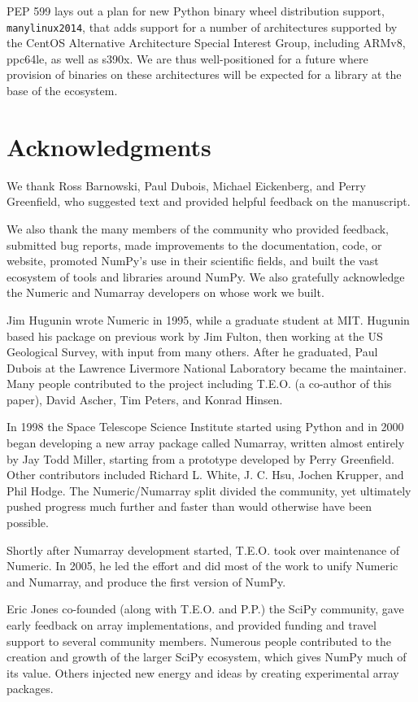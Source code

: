 \documentclass[twocolumn]{article}
\begin{document}
PEP 599 \cite{PEP599} lays out a plan for new Python binary wheel
distribution support, \texttt{manylinux2014}, that adds
support for a number of architectures supported by the CentOS
Alternative Architecture Special Interest Group, including
ARMv8, ppc64le, as well as s390x. We are thus well-positioned
for a future where provision of binaries on these architectures
will be expected for a library at the base of the ecosystem.
 
\section*{Acknowledgments}

We thank Ross Barnowski, Paul Dubois, Michael Eickenberg, and Perry Greenfield, who
suggested text and provided helpful feedback on the manuscript.

We also thank the many members of the community who provided
feedback, submitted bug reports, made improvements to the documentation,
code, or website, promoted NumPy's use in their scientific fields, and built
the vast ecosystem of tools and libraries around NumPy.
We also gratefully acknowledge the Numeric and Numarray developers
on whose work we built.  

Jim Hugunin wrote Numeric in 1995, while a graduate student at MIT.
Hugunin based his package on previous work by Jim Fulton, then working at the
US Geological Survey, with input from many others.
After he graduated, Paul Dubois at the Lawrence Livermore National Laboratory
became the maintainer.
Many people contributed to the project including T.E.O. (a co-author
of this paper), David Ascher, Tim Peters, and Konrad Hinsen.

In 1998 the Space Telescope Science Institute started using Python
and in 2000 began developing a new array package called Numarray, written
almost entirely by Jay Todd Miller, starting from a prototype developed by
Perry Greenfield.  Other contributors included Richard L. White, J. C. Hsu,
Jochen Krupper, and Phil Hodge.
The Numeric/Numarray split divided the community, yet ultimately pushed
progress much further and faster than would otherwise have been possible. 

Shortly after Numarray development started, T.E.O. took over maintenance of
Numeric. In 2005, he led the effort and did most of the work to unify Numeric
and Numarray, and produce the first version of NumPy.

Eric Jones co-founded (along with T.E.O. and P.P.) the SciPy community, gave early feedback on array
implementations, and provided funding and travel support to several
community members.
Numerous people contributed to the creation and
growth of the larger SciPy ecosystem, which gives NumPy much of its
value. Others injected new energy and ideas by creating experimental
array packages.
\end{document}
